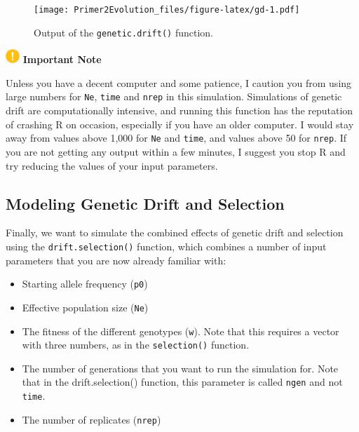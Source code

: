 \documentclass[
]{book}
\begin{document}
\begin{figure}
\centering
\texttt{[image: Primer2Evolution\_files/figure-latex/gd-1.pdf]}
\caption{\label{fig:gd}Output of the \texttt{genetic.drift()} function.}
\end{figure}

\includegraphics[width=0.20833in,height=\textheight]{images/important.png} \textbf{Important Note}

Unless you have a decent computer and some patience, I caution you from using large numbers for \texttt{Ne}, \texttt{time} and \texttt{nrep} in this simulation. Simulations of genetic drift are computationally intensive, and running this function has the reputation of crashing R on occasion, especially if you have an older computer. I would stay away from values above 1,000 for \texttt{Ne} and \texttt{time}, and values above 50 for \texttt{nrep}. If you are not getting any output within a few minutes, I suggest you stop R and try reducing the values of your input parameters.

\hypertarget{modeling-genetic-drift-and-selection}{%
\subsection{Modeling Genetic Drift and Selection}\label{modeling-genetic-drift-and-selection}}

Finally, we want to simulate the combined effects of genetic drift and selection using the \texttt{drift.selection()} function, which combines a number of input parameters that you are now already familiar with:

\begin{itemize}
\item
  Starting allele frequency (\texttt{p0})
\item
  Effective population size (\texttt{Ne})
\item
  The fitness of the different genotypes (\texttt{w}). Note that this requires a vector with three numbers, as in the \texttt{selection()} function.
\item
  The number of generations that you want to run the simulation for. Note that in the drift.selection() function, this parameter is called \texttt{ngen} and not \texttt{time}.
\item
  The number of replicates (\texttt{nrep})
\end{itemize}
\end{document}
